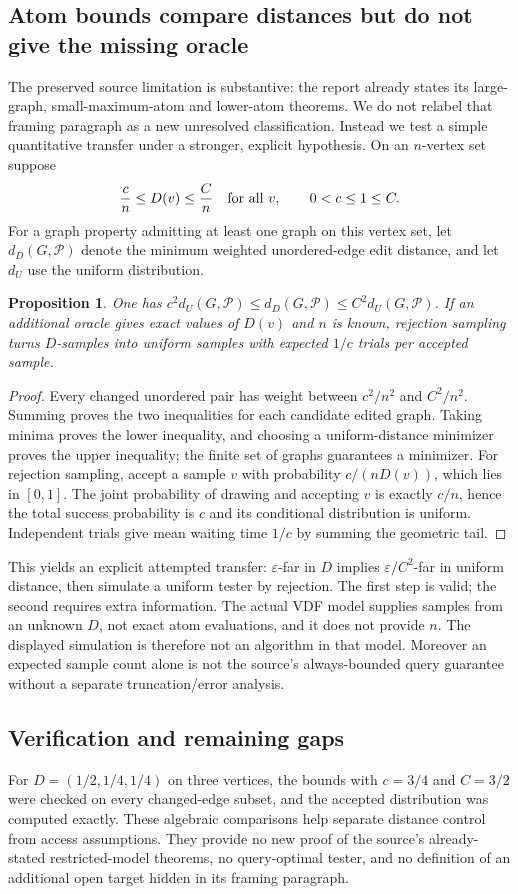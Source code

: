 \documentclass[11pt]{article}
\newtheorem{proposition}{Proposition}
\begin{document}
\subsection{Atom bounds compare distances but do not give the missing oracle}
The preserved source limitation is substantive: the report already states its large-graph, small-maximum-atom and lower-atom theorems. We do not relabel that framing paragraph as a new unresolved classification. Instead we test a simple quantitative transfer under a stronger, explicit hypothesis. On an $n$-vertex set suppose
\[
\frac c n\le D(v)\le\frac C n\quad\hbox{for all }v,
\qquad 0<c\le1\le C.
\]
For a graph property admitting at least one graph on this vertex set, let $d_D(G,\mathcal P)$ denote the minimum weighted unordered-edge edit distance, and let $d_U$ use the uniform distribution.
\begin{proposition}
One has $c^2d_U(G,\mathcal P)\le d_D(G,\mathcal P)\le C^2d_U(G,\mathcal P)$. If an additional oracle gives exact values of $D(v)$ and $n$ is known, rejection sampling turns $D$-samples into uniform samples with expected $1/c$ trials per accepted sample.
\end{proposition}
\begin{proof}
Every changed unordered pair has weight between $c^2/n^2$ and $C^2/n^2$. Summing proves the two inequalities for each candidate edited graph. Taking minima proves the lower inequality, and choosing a uniform-distance minimizer proves the upper inequality; the finite set of graphs guarantees a minimizer. For rejection sampling, accept a sample $v$ with probability $c/(nD(v))$, which lies in $[0,1]$. The joint probability of drawing and accepting $v$ is exactly $c/n$, hence the total success probability is $c$ and its conditional distribution is uniform. Independent trials give mean waiting time $1/c$ by summing the geometric tail.
\end{proof}
This yields an explicit attempted transfer: $\varepsilon$-far in $D$ implies $\varepsilon/C^2$-far in uniform distance, then simulate a uniform tester by rejection. The first step is valid; the second requires extra information. The actual VDF model supplies samples from an unknown $D$, not exact atom evaluations, and it does not provide $n$. The displayed simulation is therefore not an algorithm in that model. Moreover an expected sample count alone is not the source's always-bounded query guarantee without a separate truncation/error analysis.
\subsection{Verification and remaining gaps}
For $D=(1/2,1/4,1/4)$ on three vertices, the bounds with $c=3/4$ and $C=3/2$ were checked on every changed-edge subset, and the accepted distribution was computed exactly. These algebraic comparisons help separate distance control from access assumptions. They provide no new proof of the source's already-stated restricted-model theorems, no query-optimal tester, and no definition of an additional open target hidden in its framing paragraph.
\end{document}

